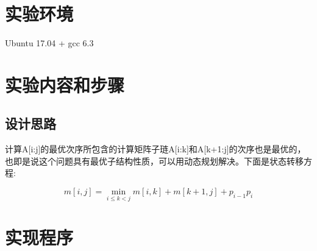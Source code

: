 \documentclass{zjureport}
\begin{document}
\section{实验环境}
Ubuntu 17.04 + gcc 6.3

\section{实验内容和步骤}
	\subsection{设计思路}
		计算A[i:j]的最优次序所包含的计算矩阵子琏A[i:k]和A[k+1:j]的次序也是最优的，也即是说这个问题具有最优子结构性质，可以用动态规划解决。下面是状态转移方程:\par
		\begin{equation}
			m[i,j]= \min_{i \leqslant k < j} {m[i,k] + m[k+1,j] + p_{i-1}p_i}
		\end{equation}

\section{实现程序}
	\begin{clause}
		
	\end{clause}
\end{document}
